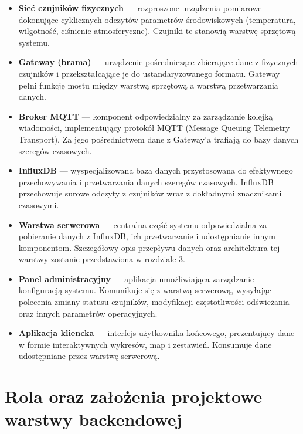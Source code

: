\documentclass[a4paper,12pt,openany]{book}
\begin{document}
\begin{itemize}
  \item \textbf{Sieć czujników fizycznych} --- rozproszone urządzenia pomiarowe dokonujące cyklicznych odczytów parametrów środowiskowych (temperatura, wilgotność, ciśnienie atmosferyczne). Czujniki te stanowią warstwę sprzętową systemu.

  \item \textbf{Gateway (brama)} --- urządzenie pośredniczące zbierające dane z fizycznych czujników i przekształcające je do ustandaryzowanego formatu. Gateway pełni funkcję mostu między warstwą sprzętową a warstwą przetwarzania danych.

  \item \textbf{Broker MQTT} --- komponent odpowiedzialny za zarządzanie kolejką wiadomości, implementujący protokół MQTT (Message Queuing Telemetry Transport). Za jego pośrednictwem dane z Gateway'a trafiają do bazy danych szeregów czasowych.

  \item \textbf{InfluxDB} --- wyspecjalizowana baza danych przystosowana do efektywnego przechowywania i przetwarzania danych szeregów czasowych. InfluxDB przechowuje surowe odczyty z czujników wraz z dokładnymi znacznikami czasowymi.

  \item \textbf{Warstwa serwerowa} --- centralna część systemu odpowiedzialna za pobieranie danych z InfluxDB, ich przetwarzanie i udostępnianie innym komponentom. Szczegółowy opis przepływu danych oraz architektura tej warstwy zostanie przedstawiona w rozdziale 3.

  \item \textbf{Panel administracyjny} --- aplikacja umożliwiająca zarządzanie konfiguracją systemu. Komunikuje się z warstwą serwerową, wysyłając polecenia zmiany statusu czujników, modyfikacji częstotliwości odświeżania oraz innych parametrów operacyjnych.

  \item \textbf{Aplikacja kliencka} --- interfejs użytkownika końcowego, prezentujący dane w formie interaktywnych wykresów, map i zestawień. Konsumuje dane udostępniane przez warstwę serwerową.
\end{itemize}

\section{Rola oraz założenia projektowe warstwy backendowej}
\end{document}
